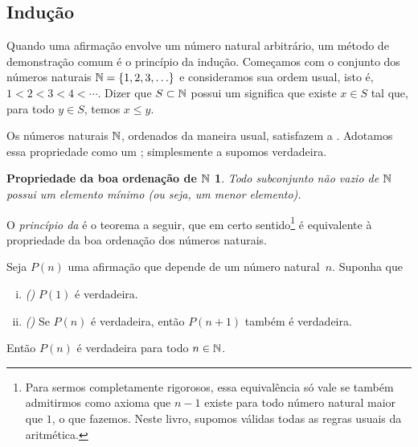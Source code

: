 \subsection{Indu\c{c}\~ao}

Quando uma afirmação envolve um número natural arbitrário,
um método de demonstração comum é o princípio da indução.
Começamos com o conjunto dos números naturais ${\mathbb{N}} = \{ 1,2,3,\ldots \}$ e
consideramos sua ordem usual,
isto é, $1 < 2 < 3 < 4 < \cdots$.
Dizer que $S \subset {\mathbb{N}}$ possui um \emph{} significa
que existe $x \in S$ tal que, para todo
$y \in S$, temos $x \leq y$.

Os números naturais ${\mathbb{N}}$, ordenados da maneira usual,
satisfazem a \emph{}.
Adotamos essa propriedade como um ; simplesmente a supomos
verdadeira.

\theoremstyle{plain}
\newtheorem*{wellordprop}{Propriedade da boa ordena\c{c}\~ao de ${\mathbb{N}}$}
\hypertarget{wop:link}{}%
\begin{wellordprop}
Todo subconjunto não vazio de ${\mathbb{N}}$ possui um elemento mínimo (ou seja, um
menor elemento).
\end{wellordprop}

O \emph{princ\'ipio da }
\'e o teorema a seguir, que em certo sentido\footnote{Para sermos
completamente rigorosos, essa equival\^encia s\'o vale se tamb\'em
admitirmos como axioma que $n-1$ existe para todo n\'umero natural maior que
$1$, o que fazemos. Neste livro, supomos v\'alidas todas as regras usuais
da aritm\'etica.}
\'e equivalente \`a propriedade da boa ordena\c{c}\~ao dos n\'umeros naturais.

\begin{thm} \label{induction:thm}
Seja $P(n)$ uma afirma\c{c}\~ao que depende de um n\'umero natural~$n$.
Suponha que
\begin{enumerate}[(i)]
\item \emph{()} $P(1)$ é verdadeira.
\item \emph{()} Se $P(n)$ é verdadeira, então
$P(n+1)$ também é verdadeira.
\end{enumerate}
Então $P(n)$ é verdadeira para todo $n \in {\mathbb{N}}$.
\end{thm}

